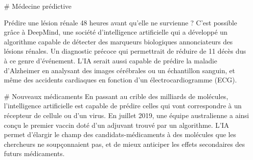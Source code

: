 # Médecine prédictive

Prédire une lésion rénale 48 heures avant qu’elle ne survienne ? C'est possible
grâce à DeepMind, une société d'intelligence artificielle qui a développé un
algorithme capable de détecter des marqueurs biologiques annonciateurs des
lésions rénales. Un diagnostic précoce qui permettrait de réduire de 11 %
décès dus à ce genre d'événement. L'IA serait aussi capable de prédire la
maladie d'Alzheimer en analysant des images cérébrales ou un échantillon
sanguin, et même des accidents cardiaques en fonction d'un électrocardiogramme
(ECG).

# Nouveaux médicaments
En passant au crible des milliards de molécules, l'intelligence artificielle
est capable de prédire celles qui vont correspondre à un récepteur de cellule
ou d'un virus. En juillet 2019, une équipe australienne a ainsi conçu le
premier vaccin doté d'un adjuvant trouvé par un algorithme. L'IA permet
d'élargir le champ des candidats-médicaments à des molécules que les chercheurs
ne soupçonnaient pas, et de mieux anticiper les effets secondaires des futurs
médicaments.


